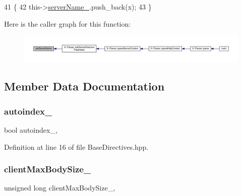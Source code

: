 \begin{DoxyCode}
41     \{
42         this->\hyperlink{classft_1_1_server_block_adc26ae834350b4c964d4198e7a431e90}{serverName\_}.push\_back(x);
43     \}
\end{DoxyCode}
Here is the caller graph for this function\+:
\nopagebreak
\begin{figure}[H]
\begin{center}
\leavevmode
\includegraphics[width=350pt]{classft_1_1_server_block_a89dfb84333debfc1871f28ef625f9556_icgraph}
\end{center}
\end{figure}


\subsection{Member Data Documentation}
\mbox{\label{classft_1_1_base_directives_a4ebffbe32f50a462afa139c6f03c1a4f}} 
\subsubsection{\texorpdfstring{autoindex\+\_\+}{autoindex\_}}
{\footnotesize\ttfamily bool autoindex\+\_\+\hspace{0.3cm}{\ttfamily [protected]}, {\ttfamily [inherited]}}



Definition at line 16 of file Base\+Directives.\+hpp.

\mbox{\label{classft_1_1_base_directives_ad65c2594d2a90ca065d410dfd4066a19}} 
\subsubsection{\texorpdfstring{client\+Max\+Body\+Size\+\_\+}{clientMaxBodySize\_}}
{\footnotesize\ttfamily unsigned long client\+Max\+Body\+Size\+\_\+\hspace{0.3cm}{\ttfamily [protected]}, {\ttfamily [inherited]}}



